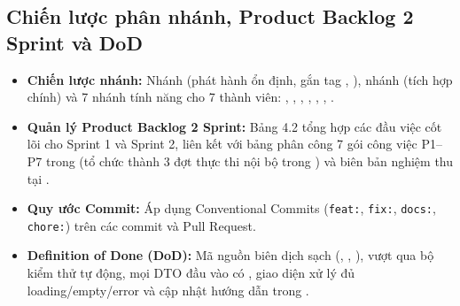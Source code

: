 \documentclass[12pt,a4paper]{report}
\begin{document}
\subsection{Chiến lược phân nhánh, Product Backlog 2 Sprint và DoD}
\begin{itemize}[leftmargin=*]
\item \textbf{Chiến lược nhánh:} Nhánh  (phát hành ổn định, gắn tag , ), nhánh  (tích hợp chính) và 7 nhánh tính năng cho 7 thành viên: , , , , , , .
\item \textbf{Quản lý Product Backlog 2 Sprint:} Bảng 4.2 tổng hợp các đầu việc cốt lõi cho Sprint 1 và Sprint 2, liên kết với bảng phân công 7 gói công việc P1--P7 trong  (tổ chức thành 3 đợt thực thi nội bộ trong ) và biên bản nghiệm thu tại .
\item \textbf{Quy ước Commit:} Áp dụng Conventional Commits (\texttt{feat:}, \texttt{fix:}, \texttt{docs:}, \texttt{chore:}) trên các commit và Pull Request.
\item \textbf{Definition of Done (DoD):} Mã nguồn biên dịch sạch (, , ), vượt qua bộ kiểm thử tự động, mọi DTO đầu vào có , giao diện xử lý đủ loading/empty/error và cập nhật hướng dẫn trong .
\end{itemize}
\end{document}
